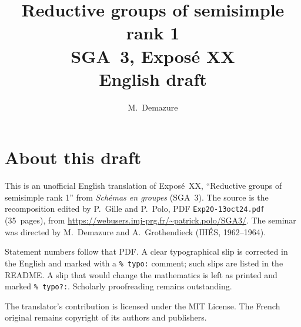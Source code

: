 \documentclass[11pt,a4paper,oneside]{amsbook}
\title[SGA~3, Expos\'e XX (English draft)]{Reductive groups of semisimple rank 1\\
{\normalsize SGA~3, Expos\'e XX\\English draft}}
\author{M.\ Demazure}
\date{}
\begin{document}
\frontmatter
\maketitle

\chapter*{About this draft}
This is an unofficial English translation of Expos\'e~XX, ``Reductive groups of semisimple rank 1''
from \textit{Sch\'emas en groupes} (SGA~3).
The source is the recomposition edited by P.~Gille and P.~Polo,
PDF \texttt{Exp20-13oct24.pdf} (35~pages),
from \url{https://webusers.imj-prg.fr/~patrick.polo/SGA3/}.
The seminar was directed by M.~Demazure and A.~Grothendieck
(IH\'ES, 1962--1964).

Statement numbers follow that PDF. A clear typographical slip is
corrected in the English and marked with a \texttt{\% typo:} comment;
such slips are listed in the README. A slip that would change the
mathematics is left as printed and marked \texttt{\% typo?:}.
Scholarly proofreading remains outstanding.

The translator's contribution is licensed under the MIT License.
The French original remains copyright of its authors and publishers.

\tableofcontents
\mainmatter






\end{document}
